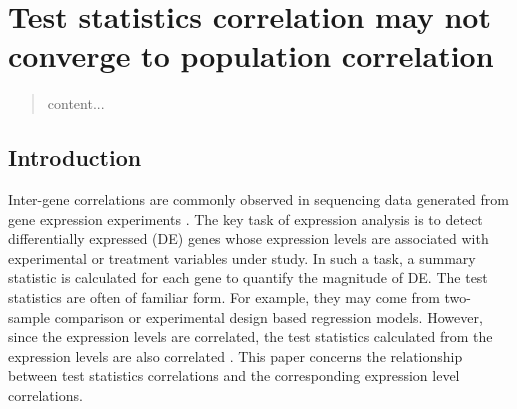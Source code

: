 \section{Test statistics correlation may not converge to population correlation}\label{chap2}

	\begin{abstract}
		content...
	\end{abstract}

	\subsection{Introduction}
	
	Inter-gene correlations are commonly observed in sequencing data generated from gene expression 
	experiments \citep{efron2012large, qiu2005effects,storey2003positive, huang2013gene, 
		gatti2010heading}.
	The key task of expression analysis is to detect differentially expressed (DE) genes whose 
	expression levels are associated with experimental or treatment variables under study. 
	In such a task, 
	a summary statistic is calculated for each gene to quantify the magnitude of DE. The test 
	statistics are often of familiar form. For example, 
	they may come from two-sample comparison or experimental design based regression models. 
	However, since the expression levels are correlated, the test statistics calculated from the 
	expression levels are also correlated \citep{barry2008statistical, efron2007correlation, 
		wu2012camera}. This paper concerns the relationship between test 
	statistics correlations and the corresponding expression level correlations.
	
